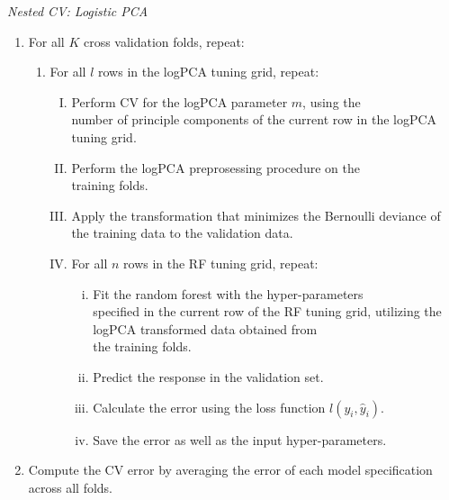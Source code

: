 \documentclass[a4paper,12pt, headsepline]{scrartcl}
\numberwithin{equation}{section}
\begin{document}
{\centering
	\begin{minipage}{.9\linewidth}
		\begin{algorithm}[H]
			\caption{\textit{Nested CV: Logistic PCA}}\label{alg:three}
			\begin{enumerate}
				\item For all $K$ cross validation folds, repeat:
					\begin{enumerate}
					\item For all $l$ rows in the logPCA tuning grid, repeat:
					\begin{enumerate}[I.]
						\item Perform CV for the logPCA parameter $m$, using the\\ number of principle components of the current row in the logPCA tuning grid.
						\item Perform the logPCA preprosessing procedure on the\\ training folds.
						\item Apply the transformation that minimizes the Bernoulli deviance of the training data to the validation data.
						\item For all $n$ rows in the RF tuning grid, repeat:
						\begin{enumerate}[i.]
							\item Fit the random forest with the hyper-parameters\\ specified in the current row of the RF tuning grid, utilizing the logPCA transformed data obtained from\\ the training folds.
							\item Predict the response in the validation set.
							\item Calculate the error using the loss function $l(y_i, \hat y_i)$.
							\item Save the error as well as the input hyper-parameters.
						\end{enumerate}
					\end{enumerate} 
				\end{enumerate}
			  \item Compute the CV error by averaging the error of each model specification across all folds.
			\end{enumerate}
		\end{algorithm}
	\end{minipage}
	\par
}
\end{document}

